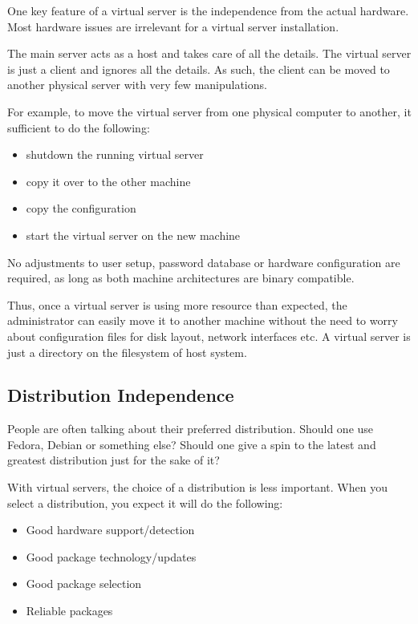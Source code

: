One key feature of a virtual server is the independence from the actual
hardware. Most hardware issues are irrelevant for a virtual server
installation.

The main server acts as a host and takes care of all the details. The virtual
server is just a client and ignores all the details. As such, the client can be
moved to another physical server with very few manipulations.

For example, to move the virtual server from one physical computer to another,
it sufficient to do the following:

\begin{itemize}
	\item shutdown the running virtual server
	\item copy it over to the other machine
	\item copy the configuration
	\item start the virtual server on the new machine
\end{itemize}

No adjustments to user setup, password database or hardware configuration are
required, as long as both machine architectures are binary compatible.

Thus, once a virtual server is using more resource than expected, the
administrator can easily move it to another machine without the need to worry
about configuration files for disk layout, network interfaces etc. A virtual
server is just a directory on the filesystem of host system.


\subsection{Distribution Independence}

People are often talking about their preferred distribution. Should one use
Fedora, Debian or something else? Should one give a spin to the latest and
greatest distribution just for the sake of it?

With virtual servers, the choice of a distribution is less important. When you
select a distribution, you expect it will do the following:

\begin{itemize}
	\item Good hardware support/detection
	\item Good package technology/updates
	\item Good package selection
	\item Reliable packages
\end{itemize}

